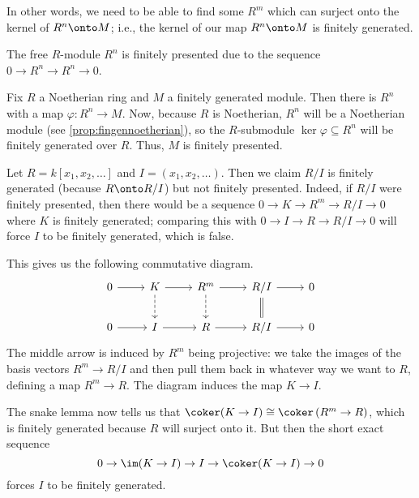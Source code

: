 In other words, we need to be able to find some $R^m$ which can surject onto the kernel of $R^n\onto M$; i.e., the kernel of our map $R^n\onto M$ is finitely generated.
\begin{example}
	The free $R$-module $R^n$ is finitely presented due to the sequence $0\to R^n\to R^n\to 0$.
\end{example}
\begin{example} \label{ex:fingennoetherian}
	Fix $R$ a Noetherian ring and $M$ a finitely generated module. Then there is $R^n$ with a map $\varphi:R^n\to M$. Now, because $R$ is Noetherian, $R^n$ will be a Noetherian module (see \autoref{prop:fingennoetherian}), so the $R$-submodule $\ker\varphi\subseteq R^n$ will be finitely generated over $R$. Thus, $M$ is finitely presented.
\end{example}
\begin{nex}
	Let $R=k[x_1,x_2,\ldots]$ and $I=(x_1,x_2,\ldots)$. Then we claim $R/I$ is finitely generated (because $R\onto R/I$) but not finitely presented. Indeed, if $R/I$ were finitely presented, then there would be a sequence $0\to K\to R^m\to R/I\to 0$ where $K$ is finitely generated; comparing this with $0\to I\to R\to R/I\to0$ will force $I$ to be finitely generated, which is false.
	
	This gives us the following commutative diagram.
	\[\begin{tikzcd}
		0 & K & {R^m} & {R/I} & 0 \\
		0 & I & R & {R/I} & 0
		\arrow[Rightarrow, no head, from=1-4, to=2-4]
		\arrow[from=1-3, to=1-4]
		\arrow[from=2-1, to=2-2]
		\arrow[from=2-2, to=2-3]
		\arrow[from=2-3, to=2-4]
		\arrow[from=2-4, to=2-5]
		\arrow[from=1-4, to=1-5]
		\arrow[from=1-2, to=1-3]
		\arrow[dashed, from=1-3, to=2-3]
		\arrow[dashed, from=1-2, to=2-2]
		\arrow[from=1-1, to=1-2]
	\end{tikzcd}\]
	The middle arrow is induced by $R^m$ being projective: we take the images of the basis vectors $R^m\to R/I$ and then pull them back in whatever way we want to $R$, defining a map $R^m\to R$. The diagram induces the map $K\to I$.

	The snake lemma now tells us that $\coker(K\to I)\cong\coker\left(R^m\to R\right)$, which is finitely generated because $R$ will surject onto it. But then the short exact sequence
	\[0\to\im(K\to I)\to I\to\coker(K\to I)\to0\]
	forces $I$ to be finitely generated.
\end{nex}
